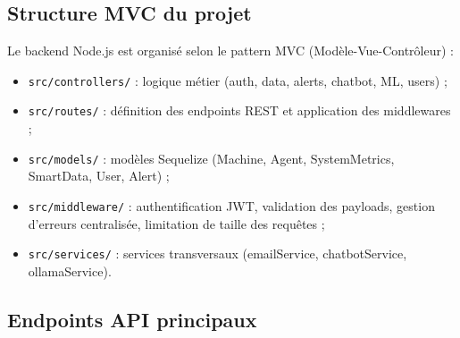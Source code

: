 \subsection{Structure MVC du projet}

Le backend Node.js est organisé selon le pattern MVC (Modèle-Vue-Contrôleur) :

\begin{itemize}
  \item \texttt{src/controllers/} : logique métier (auth, data, alerts, chatbot, ML, users) ;
  \item \texttt{src/routes/} : définition des endpoints REST et application des middlewares ;
  \item \texttt{src/models/} : modèles Sequelize (Machine, Agent, SystemMetrics, SmartData,
        User, Alert) ;
  \item \texttt{src/middleware/} : authentification JWT, validation des payloads, gestion
        d'erreurs centralisée, limitation de taille des requêtes ;
  \item \texttt{src/services/} : services transversaux (emailService, chatbotService,
        ollamaService).
\end{itemize}

\subsection{Endpoints API principaux}

